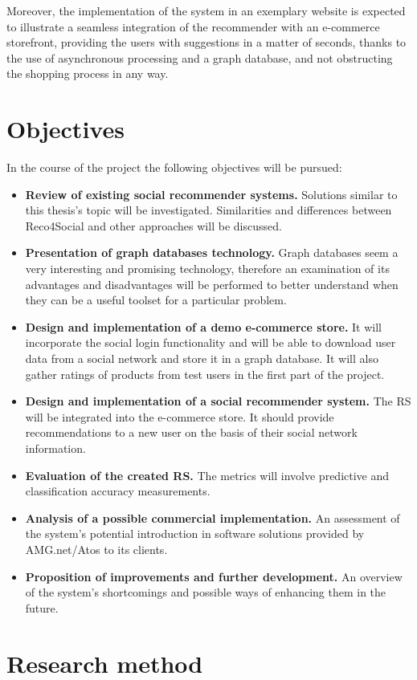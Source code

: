 \documentclass[12pt]{report}
\begin{document}
Moreover, the implementation of the system in an exemplary website is expected to illustrate a seamless integration of the recommender with an e-commerce storefront, providing the users with suggestions in a matter of seconds, thanks to the use of asynchronous processing and a graph database, and not obstructing the shopping process in any way.

\section{Objectives}

In the course of the project the following objectives will be pursued:
\begin{itemize}
\item {\bf Review of existing social recommender systems.} Solutions similar to this thesis's topic will be investigated. Similarities and differences between Reco4Social and other approaches will be discussed.
\item {\bf Presentation of graph databases technology.} Graph databases seem a very interesting and promising technology, therefore an examination of its advantages and disadvantages will be performed to better understand when they can be a useful toolset for a particular problem.
\item {\bf Design and implementation of a demo e-commerce store.} It will incorporate the social login functionality and will be able to download user data from a social network and store it in a graph database. It will also gather ratings of products from test users in the first part of the project.
\item {\bf Design and implementation of a social recommender system.} The RS will be integrated into the e-commerce store. It should provide recommendations to a new user on the basis of their social network information.
\item {\bf Evaluation of the created RS.} The metrics will involve predictive and classification accuracy measurements.
\item {\bf Analysis of a possible commercial implementation.} An assessment of the system's potential introduction in software solutions provided by AMG.net/Atos to its clients.
\item {\bf Proposition of improvements and further development.} An overview of the system's shortcomings and possible ways of enhancing them in the future.
\end{itemize}

\section{Research method}
\end{document}
